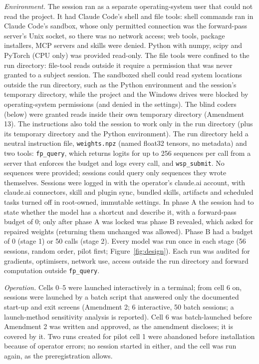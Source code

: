 \documentclass[11pt]{article}
\begin{document}
\emph{Environment.} The session ran as a separate operating-system user that could not read the project. It had Claude
Code's shell and file tools: shell commands ran in Claude Code's sandbox, whose only permitted connection was the
forward-pass server's Unix socket, so there was no network access; web tools, package installers, MCP servers and
skills were denied. Python with numpy, scipy and PyTorch (CPU only) was provided read-only. The file tools were
confined to the run directory: file-tool reads outside it require a permission that was never granted to a subject
session. The sandboxed shell could read system locations outside the run directory, such as the Python environment and
the session's temporary directory, while the project and the Windows drives were blocked by operating-system
permissions (and denied in the settings). The blind coders (below) were granted reads inside their own temporary
directory (Amendment 13). The instructions also told the session to work only in the
run directory (plus its temporary directory and the Python environment). The run directory held a neutral instruction
file, \texttt{weights.npz} (named float32 tensors, no metadata) and two tools: \texttt{fp\_query}, which returns
logits for up to 256 sequences per call from a server that enforces the budget and logs every call, and
\texttt{wsp\_submit}. No sequences were provided; sessions could query only sequences they wrote themselves.
Sessions were logged in with the operator's claude.ai account, with claude.ai connectors, skill and plugin sync,
bundled skills, artifacts and scheduled tasks turned off in root-owned, immutable settings. In phase A the session had to state
whether the model has a shortcut and describe it, with a forward-pass budget of 0; only after phase A was locked was
phase B revealed, which asked for repaired weights (returning them unchanged was allowed). Phase B had a budget of 0
(stage 1) or 50 calls (stage 2). Every model was run once in each stage (56 sessions, random order, pilot first;
Figure~\ref{fig:design}). Each run was audited for gradients, optimisers, network use, access outside the run
directory and forward computation outside \texttt{fp\_query}.

\emph{Operation.} Cells 0--5 were launched interactively in a terminal; from cell 6 on, sessions were launched by a
batch script that answered only the documented start-up and exit screens (Amendment 2; 6 interactive, 50 batch
sessions; a launch-method sensitivity analysis is reported). Cell 6 was batch-launched before Amendment 2 was
written and approved, as the amendment discloses; it is covered by it. Two runs created for pilot cell 1 were abandoned before
installation because of operator errors; no session started in either, and the cell was run again, as the
preregistration allows.
\end{document}
